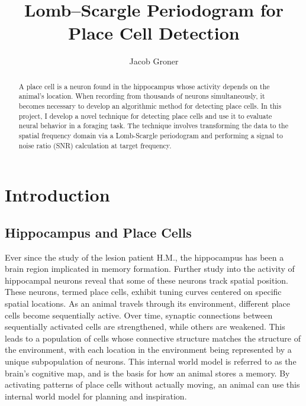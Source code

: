 \documentclass[preprint]{aastex701}
\begin{document}
\title{Lomb--Scargle Periodogram for Place Cell Detection}

\author{Jacob Groner}

\begin{abstract}
    A place cell is a neuron found in the hippocampus whose activity depends on the animal's location. When recording from thousands of neurons simultaneously, it becomes necessary to develop an algorithmic method for detecting place cells. In this project, I develop a novel technique for detecting place cells and use it to evaluate neural behavior in a foraging task. The technique involves transforming the data to the spatial frequency domain via a Lomb-Scargle periodogram and performing a signal to noise ratio (SNR) calculation at target frequency.

    
\end{abstract}

\section{Introduction}

\subsection{Hippocampus and Place Cells}

Ever since the study of the lesion patient H.M., the hippocampus has been a brain region implicated in memory formation. \citep{scoville1957hm} Further study into the activity of hippocampal neurons reveal that some of these neurons track spatial position. These neurons, termed place cells, exhibit tuning curves centered on specific spatial locations. \citep{okeefe1971spatialmap} As an animal travels through its environment, different place cells become sequentially active. Over time, synaptic connections between sequentially activated cells are strengthened, while others are weakened. This leads to a population of cells whose connective structure matches the structure of the environment, with each location in the environment being represented by a unique subpopulation of neurons. This internal world model is referred to as the brain's cognitive map, \citep{okeefe1978cognitivemap} and is the basis for how an animal stores a memory. By activating patterns of place cells without actually moving, an animal can use this internal world model for planning and inspiration.
\end{document}
